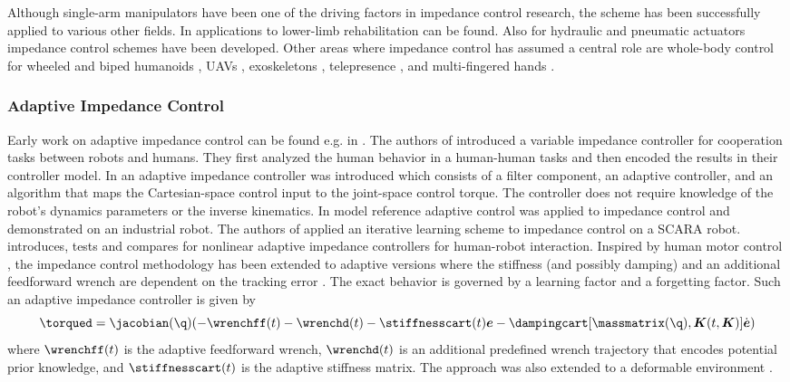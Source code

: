 Although single-arm manipulators have been one of the driving factors in impedance control research, the scheme has been successfully applied to various other fields.
In \cite{Ibarra.2014} applications to lower-limb rehabilitation can be found.
Also for hydraulic \cite{Ha.2000,Koivumaki.2017} and pneumatic \cite{Toedtheide.2016,Toedtheide.2017} actuators impedance control schemes have been developed.
Other areas where impedance control has assumed a central role are whole-body control for wheeled \cite{Dietrich.2011,Dietrich.2016,Bussmann.2018} and biped humanoids \cite{Rocchi.2015,Vorndamme.2016,Koivumaki.2017}, UAVs \cite{Lippiello.2012}, exoskeletons \cite{Khan.2015,Li.2017}, telepresence \cite{Love.2004,Nuno.2008,Tufail.2014}, and multi-fingered hands \cite{Wimbock.2011}.

\subsubsection{Adaptive Impedance Control}

Early work on adaptive impedance control can be found e.g. in \cite{Carelli.1991,kelly1989adaptive}.
The authors of \cite{Ikeura.1995} introduced a variable impedance controller for cooperation tasks between robots and humans.
They first analyzed the human behavior in a human-human tasks and then encoded the results in their controller model.
In \cite{Colbaugh.1993} an adaptive impedance controller was introduced which consists of a filter component, an adaptive controller, and an algorithm that maps the Cartesian-space control input to the joint-space control torque.
The controller does not require knowledge of the robot's dynamics parameters or the inverse kinematics.
In \cite{Kamnik.1998} model reference adaptive control was applied to impedance control and demonstrated on an industrial robot.
The authors of \cite{Cheah.1998} applied an iterative learning scheme to impedance control on a SCARA robot.
\cite{sharifi2014nonlinear} introduces, tests and compares for nonlinear adaptive impedance controllers for human-robot interaction.
Inspired by human motor control \cite{Burdet.2001}, the impedance control methodology has been extended to adaptive versions where the stiffness (and possibly damping) and an additional feedforward wrench are dependent on the tracking error \cite{Ganesh.2010,Yang.2011,Ganesh.2012}.
The exact behavior is governed by a learning factor and a forgetting factor.
Such an adaptive impedance controller is given by
\begin{equation*}
        \torqued=\jacobian(\q)(-\wrenchff(t)-\wrenchd(t)-\stiffnesscart(t)\boldsymbol{e}-\dampingcart[\massmatrix(\q),\boldsymbol{K}(t,\boldsymbol{K})] \dot{\boldsymbol{e}})
\end{equation*}
where $\wrenchff(t)$ is the adaptive feedforward wrench, $\wrenchd(t)$ is an additional predefined wrench trajectory that encodes potential prior knowledge, and $\stiffnesscart(t)$ is the adaptive stiffness matrix.
The approach was also extended to a deformable environment \cite{li2018force}.

